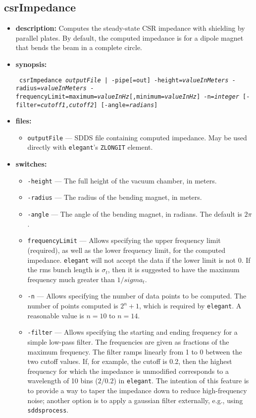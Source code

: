 \documentclass[11pt]{article}
\begin{document}
\subsection{csrImpedance}

\begin{itemize}
\item {\bf description:}  Computes the steady-state CSR impedance with shielding by parallel plates.
By default, the computed impedance is for a dipole magnet that bends the beam in a complete circle.

\item {\bf synopsis:}
\begin{flushleft}{\tt
csrImpedance {{\em outputFile}  | -pipe[=out]} -height={\em valueInMeters} -radius={\em valueInMeters}
-frequencyLimit=maximum={\em valueInHz}[,minimum={\em valueInHz}] -n={\em integer} [-filter={\em cutoff1},{\em cutoff2}]
[-angle={\em radians}]
}\end{flushleft}

\item {\bf files:}
\begin{itemize}
\item {\tt outputFile} --- SDDS file containing computed impedance.  May be used directly with 
{\tt elegant}'s \verb|ZLONGIT| element.
\end{itemize}

\item {\bf switches:}
\begin{itemize}
\item {\tt -height} --- The full height of the vacuum chamber, in meters.
\item {\tt -radius} --- The radius of the bending magnet, in meters.
\item {\tt -angle} --- The angle of the bending magnet, in radians.  The default is $2\pi$.
\item {\tt frequencyLimit} --- Allows specifying the upper frequency limit (required), as well as the
 lower frequency limit, for the computed impedance.  {\tt elegant} will not accept the data if the lower
 limit is not 0.  If the rms bunch length is $\sigma_t$, then it is suggested to have the maximum frequency 
 much greater than $1/sigma_t$.
\item {\tt -n} --- Allows specifying the number of data points to be computed. The number of points computed
 is $2^n+1$, which is required by {\tt elegant}.  A reasonable value is $n=10$ to $n=14$.
\item {\tt -filter} --- Allows specifying the starting and ending frequency for a simple low-pass filter.
 The frequencies are given as fractions of the maximum frequency.  The filter ramps linearly from 1 to 0
 between the two cutoff values.  If, for example, the cutoff is 0.2, then the highest frequency for which the
 impedance is unmodified corresponds to a wavelength of 10 bins ($2/0.2$) in {\tt elegant}. The intention of
 this feature is to provide a way to taper the impedance down to reduce high-frequency noise; another option
 is to apply a gaussian filter externally, e.g., using \verb|sddsprocess|.
\end{itemize}


\end{itemize}
\end{document}
